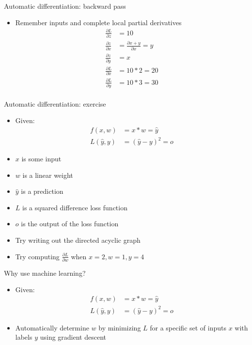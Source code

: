 \documentclass[hyperref={pdfpagelabels=false},12pt]{beamer}
\begin{document}
\begin{frame}{Automatic differentiation: backward pass}
  \begin{itemize}
    \item Remember inputs and complete local partial derivatives
      \begin{align*}
        \frac{\partial L}{\partial z} &= 10 \\
        \frac{\partial z}{\partial x} &= \frac{\partial x + y}{\partial x} = y \\
        \frac{\partial z}{\partial y} &= x \\
        \frac{\partial L}{\partial x} &= 10 * 2 = 20 \\
        \frac{\partial L}{\partial y} &= 10 * 3 = 30 \\
      \end{align*}
  \end{itemize}
\end{frame}

\begin{frame}{Automatic differentiation: exercise}
  \begin{itemize}
      \item Given:
        \begin{align*}
          f(x, w) &= x * w = \hat{y} \\
          L(\hat{y}, y) &= (\hat{y} - y)^2 = o
        \end{align*}
      \item $x$ is some input
      \item $w$ is a linear weight
      \item $\hat{y}$ is a prediction
      \item $L$ is a squared difference loss function
      \item $o$ is the output of the loss function
      \item Try writing out the directed acyclic graph
      \item Try computing $\frac{\partial L}{\partial w}$ when $x=2, w=1, y=4$
  \end{itemize}
\end{frame}

\begin{frame}{Why use machine learning?}
  \begin{itemize}
    \item Given:
      \begin{align*}
        f(x, w) &= x * w = \hat{y} \\
        L(\hat{y}, y) &= (\hat{y} - y)^2 = o
      \end{align*}
    \item Automatically determine $w$ by minimizing $L$ for a specific set of
      inputs $x$ with labels $y$ using gradient descent
  \end{itemize}
\end{frame}
\end{document}
